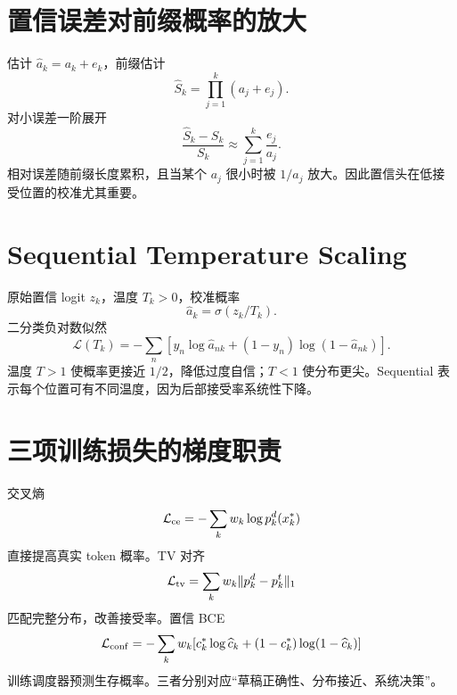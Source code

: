 \documentclass[UTF8,12pt,a4paper,fontset=none]{ctexart}
\numberwithin{equation}{section}
\newcommand{\Loss}{\mathcal{L}}
\begin{document}
\section{置信误差对前缀概率的放大}
估计 $\widehat a_k=a_k+e_k$，前缀估计
\begin{equation}
 \widehat S_k=\prod_{j=1}^{k}(a_j+e_j).
\end{equation}
对小误差一阶展开
\begin{equation}
 \frac{\widehat S_k-S_k}{S_k}
 \approx\sum_{j=1}^{k}\frac{e_j}{a_j}.
\end{equation}
相对误差随前缀长度累积，且当某个 $a_j$ 很小时被 $1/a_j$ 放大。因此置信头在低接受位置的校准尤其重要。

\section{Sequential Temperature Scaling}
原始置信 logit $z_k$，温度 $T_k>0$，校准概率
\begin{equation}
 \widehat a_k=\sigma(z_k/T_k).
\end{equation}
二分类负对数似然
\begin{equation}
 \Loss(T_k)=
 -\sum_n[y_n\log\widehat a_{nk}+
 (1-y_n)\log(1-\widehat a_{nk})].
\end{equation}
温度 $T>1$ 使概率更接近 $1/2$，降低过度自信；$T<1$ 使分布更尖。Sequential 表示每个位置可有不同温度，因为后部接受率系统性下降。

\section{三项训练损失的梯度职责}
交叉熵
\begin{equation}
 \Loss_{\rm ce}=-\sum_kw_k\log p_k^d(x_k^*)
\end{equation}
直接提高真实 token 概率。TV 对齐
\begin{equation}
 \Loss_{\rm tv}=
 \sum_kw_k\|p_k^d-p_k^t\|_1
\end{equation}
匹配完整分布，改善接受率。置信 BCE
\begin{equation}
 \Loss_{\rm conf}=-\sum_kw_k
 [c_k^*\log\widehat c_k+(1-c_k^*)\log(1-\widehat c_k)]
\end{equation}
训练调度器预测生存概率。三者分别对应“草稿正确性、分布接近、系统决策”。
\end{document}
